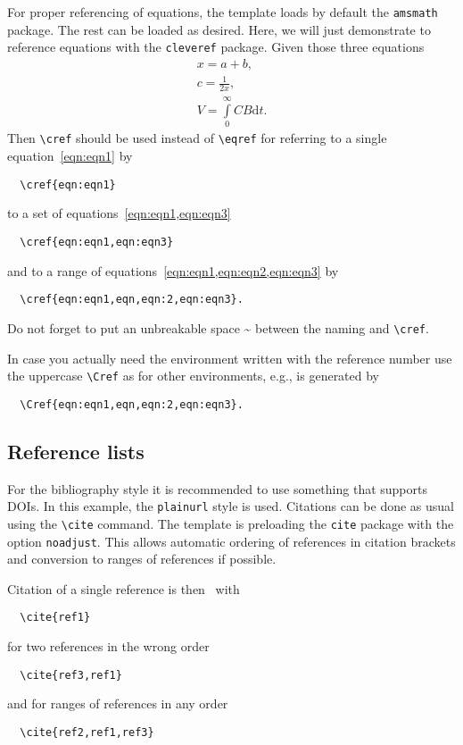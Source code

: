 \documentclass[%
  a4paper,
  twocolumn,
  colorlinks,
]{preprint}
\begin{document}
For proper referencing of equations, the template loads by default the
\verb|amsmath| package.
The rest can be loaded as desired.
Here, we will just demonstrate to reference equations with the \verb|cleveref|
package.
Given those three equations
\begin{align}
  \label{eqn:eqn1}
  x = a + b,\\
  \label{eqn:eqn2}
  c = \frac{1}{2 x},\\
  \label{eqn:eqn3}
  V = \int\limits_{0}^{\infty} CB \mathrm{d}t.
\end{align}
Then \verb|\cref| should be used instead of \verb|\eqref| for referring to
a single equation~\cref{eqn:eqn1} by
\begin{verbatim}
  \cref{eqn:eqn1}
\end{verbatim}
to a set of equations~\cref{eqn:eqn1,eqn:eqn3}
\begin{verbatim}
  \cref{eqn:eqn1,eqn:eqn3}
\end{verbatim}
and to a range of equations~\cref{eqn:eqn1,eqn:eqn2,eqn:eqn3} by
\begin{verbatim}
  \cref{eqn:eqn1,eqn,eqn:2,eqn:eqn3}.
\end{verbatim}
Do not forget to put an unbreakable space \~{} between the naming and
\verb|\cref|.

In case you actually need the environment written with the reference number
use the uppercase \verb|\Cref| as for other environments, e.g.,
 is generated by
\begin{verbatim}
  \Cref{eqn:eqn1,eqn,eqn:2,eqn:eqn3}.
\end{verbatim}


\subsection{Reference lists}%
\label{subsec:ref}

For the bibliography style it is recommended to use something that supports
DOIs.
In this example, the \verb|plainurl| style is used.
Citations can be done as usual using the \verb|\cite| command.
The template is preloading the \verb|cite| package with the option
\verb|noadjust|.
This allows automatic ordering of references in citation brackets and conversion
to ranges of references if possible.

Citation of a single reference is then~\cite{ref1} with
\begin{verbatim}
  \cite{ref1}
\end{verbatim}
for two references in the wrong order~\cite{ref3, ref1}
\begin{verbatim}
  \cite{ref3,ref1}
\end{verbatim}
and for ranges of references in any order~\cite{ref2, ref1, ref3}
\begin{verbatim}
  \cite{ref2,ref1,ref3}
\end{verbatim}
\end{document}
